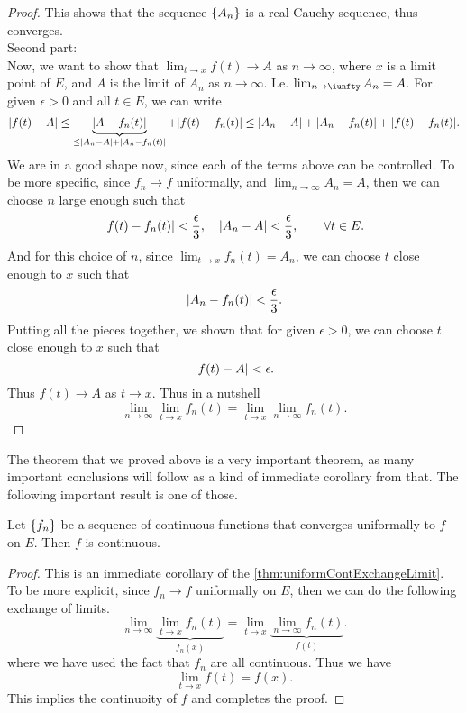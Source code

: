 \begin{proof}
	This shows that the sequence $ \{A_n\} $ is a real Cauchy sequence, thus converges. \\
	{\color{orange} Second part: }\\
	\noindent Now, we want to show that $ \lim_{t\to x}f(t) \to A $ as $ n\to \infty $, where $ x $ is a limit point of $ E $, and $ A $ is the limit of $ A_n $ as $ n\to \infty $. I.e. $ \lim_{n\to\iunfty}A_n= A $. For given $\epsilon>0$ and all $ t \in E $, we can write
	\[ |f(t) - A| \leq \underbrace{|A - f_n(t)|}_{\leq |A_n - A|+|A_n-f_n(t)|} + |f(t) - f_n(t)| \leq |A_n - A|+|A_n-f_n(t)| + |f(t) - f_n(t)|. \]
	We are in a good shape now, since each of the terms above can be controlled. To be more specific, since $ f_n \to f $ uniformally, and $ \lim_{n\to\infty} A_n = A $, then we can choose $ n $ large enough such that 
	\[ |f(t) - f_n(t)| < \frac\epsilon3, \quad |A_n - A| < \frac\epsilon3  , \qquad \forall t\in E. \]
	And for this choice of $ n $, since $ \lim_{t \to x}f_n(t)=A_n$, we can choose $ t $ close enough to $ x $ such that 
	\[ |A_n - f_n(t)| < \frac\epsilon3. \]
	Putting all the pieces together, we shown that for given $ \epsilon>0 $, we can choose $ t $ close enough to $ x $ such that 
	\[ |f(t) -  A| < \epsilon.  \]
	Thus $ f(t) \to A $ as $ t \to x $. Thus in a nutshell
	\[ \lim_{n\to\infty}\lim_{t\to x}f_n(t) = \lim_{t\to x}\lim_{n\to\infty}f_n(t). \]
\end{proof}

The theorem that we proved above is a very important theorem, as many important conclusions will follow as a kind of immediate corollary from that. The following important result is one of those.

\begin{corollary}
	Let $ \{f_n\} $ be a sequence of continuous functions that converges uniformally to $ f $ on $ E $. Then $ f $ is continuous.
\end{corollary}
\begin{proof}
	This is an immediate corollary of the \autoref{thm:uniformContExchangeLimit}. To be more explicit, since $ f_n \to f $ uniformally on $ E $, then we can do the following exchange of limits.
	\[ \lim_{n\to\infty}\underbrace{\lim_{t\to x}f_n(t)}_{f_n(x)} = \lim_{t\to x}\underbrace{\lim_{n\to\infty}f_n(t)}_{f(t)}. \]
	where we have used the fact that $ f_n $ are all continuous. Thus we have 
	\[ \lim_{t\to x} f(t) = f(x). \]
	This implies the continuoity of $ f $ and completes the proof.
\end{proof}

